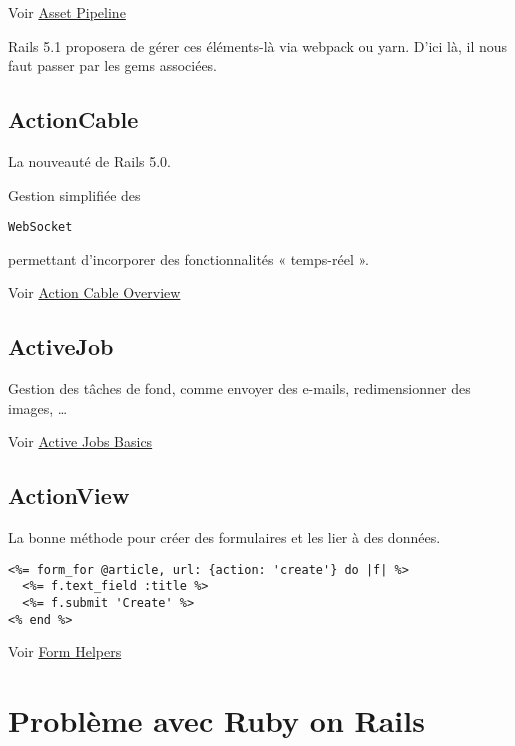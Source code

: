 Voir \href{http://guides.rubyonrails.org/asset_pipeline.html}{Asset
Pipeline}

Rails 5.1 proposera de gérer ces éléments-là via webpack ou yarn. D'ici
là, il nous faut passer par les gems associées.

\hypertarget{actioncable}{%
\subsection{ActionCable}\label{actioncable}}

La nouveauté de Rails 5.0.

Gestion simplifiée des
\begin{otherlanguage}{english}\texttt{WebSocket}\end{otherlanguage}
permettant d'incorporer des fonctionnalités « temps-réel ».

Voir
\href{http://guides.rubyonrails.org/action_cable_overview.html}{Action
Cable Overview}

\hypertarget{activejob}{%
\subsection{ActiveJob}\label{activejob}}

Gestion des tâches de fond, comme envoyer des e-mails, redimensionner
des images, \ldots{}

Voir \href{http://guides.rubyonrails.org/active_job_basics.html}{Active
Jobs Basics}

\hypertarget{actionview}{%
\subsection{ActionView}\label{actionview}}

La bonne méthode pour créer des formulaires et les lier à des données.

\begin{otherlanguage}{english}

\begin{verbatim}
<%= form_for @article, url: {action: 'create'} do |f| %>
  <%= f.text_field :title %>
  <%= f.submit 'Create' %>
<% end %>
\end{verbatim}

\end{otherlanguage}

Voir \href{http://guides.rubyonrails.org/form_helpers.html}{Form
Helpers}

\hypertarget{probluxe8me-avec-ruby-on-rails}{%
\section{Problème avec Ruby on
Rails}\label{probluxe8me-avec-ruby-on-rails}}

